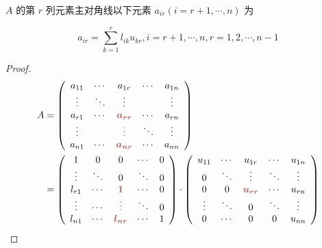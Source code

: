 \begin{theorem}
    $ A $ 的第 $ r $ 列元素主对角线以下元素 $ a_{i r}(i=r+1, \cdots, n) $ 为

    $$a_{i r}=\sum_{k=1}^{r} l_{i k} u_{k r}, i=r+1, \cdots, n, r=1,2, \cdots, n-1 $$
\end{theorem}

\begin{proof}
    $$\displaystyle
        \begin{aligned}
            A & =\left(\begin{array}{ c c c c c }
                a_{11} & \cdots & a_{1r}                                                & \cdots & a_{1n} \\
                \vdots & \ddots & \vdots                                                &        & \vdots \\
                a_{r1} & \cdots & \boldsymbol{\textcolor[rgb]{0.72,0.33,0.31}{a_{rr}}}  & \cdots & a_{rn} \\
                \vdots &        & \boldsymbol{\textcolor[rgb]{0.72,0.33,0.31}{\vdots }} & \ddots & \vdots \\
                a_{n1} & \cdots & \boldsymbol{\textcolor[rgb]{0.72,0.33,0.31}{a_{nr}}}  & \cdots & a_{nn}
            \end{array}\right)                                               \\
              & =\left(\begin{array}{ c c c c c }
                1      & 0      & 0                                                     & \cdots & 0 \\
                \vdots & \ddots & 0                                                     & \ddots & 0 \\
                l_{r1} & \cdots & \boldsymbol{\textcolor[rgb]{0.72,0.33,0.31}{1}}       & \cdots & 0 \\
                \vdots & \cdots & \boldsymbol{\textcolor[rgb]{0.72,0.33,0.31}{\vdots }} & \ddots & 0 \\
                l_{n1} & \cdots & \boldsymbol{\textcolor[rgb]{0.72,0.33,0.31}{l_{nr}}}  & \cdots & 1
            \end{array}\right) \cdot \left(\begin{array}{ c c c c c }
                u_{11} & \cdots & u_{1r}                                               & \cdots & u_{1n} \\
                0      & \ddots & \vdots                                               & \ddots & \vdots \\
                0      & 0      & \boldsymbol{\textcolor[rgb]{0.72,0.33,0.31}{u_{rr}}} & \cdots & u_{rn} \\
                \vdots & \ddots & 0                                                    & \ddots & \vdots \\
                0      & \cdots & 0                                                    & 0      & u_{nn}
            \end{array}\right)\end{aligned}
    $$
\end{proof}

